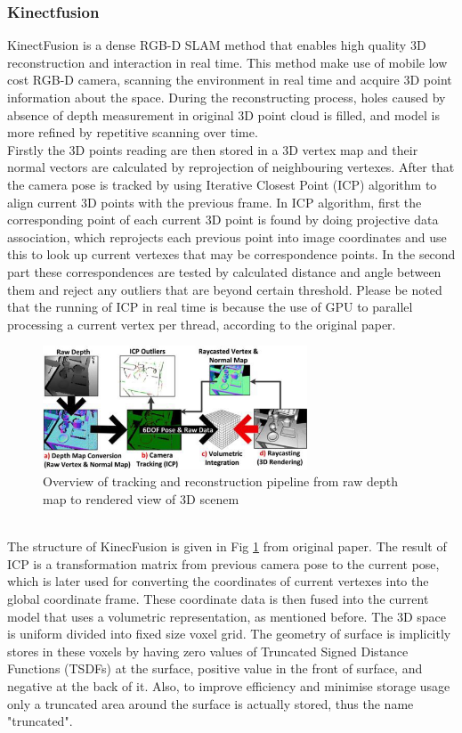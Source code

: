 \documentclass[12pt,twoside]{article}
\begin{document}
\subsubsection{Kinectfusion}
KinectFusion\cite{newcombe2011kinectfusion} is a dense RGB-D SLAM method that enables high quality 3D reconstruction and interaction in real time.
This method make use of mobile low cost RGB-D camera, scanning the environment in real time and acquire 3D point information about the space. During the reconstructing process, holes caused by absence of depth measurement in original 3D point cloud is filled, and model is more refined by repetitive scanning over time.\\
Firstly the 3D points reading are then stored in a 3D vertex map and their normal vectors are calculated by reprojection of neighbouring vertexes. After that the camera pose is tracked by  using Iterative Closest Point (ICP) algorithm to align current 3D points with the previous frame. In ICP algorithm, first the corresponding point of each current 3D point is found by doing  projective data association, which reprojects each previous point into image coordinates and use this to look up current vertexes that may be correspondence points. In the second part these correspondences are tested by calculated distance and angle between them and reject any outliers that are beyond certain threshold. Please be noted that the running of ICP in real time is because the use of GPU to parallel processing a current vertex per thread, according to the original paper.\\
\begin{figure}[h]
    \centering
    \includegraphics[width=0.7\textwidth]{figures/kinec}
    \caption{Overview of tracking and reconstruction pipeline
from raw depth map to rendered view of 3D scenem\cite{newcombe2011kinectfusion}}
    \label{fig:kinec}
\end{figure}
\\The structure of KinecFusion is given in Fig \ref{fig:kinec} from original paper. The result of ICP is a transformation matrix from previous camera pose to the current pose, which is later used for converting the coordinates of current vertexes into the global coordinate frame. These coordinate data is then fused into the current model that uses a volumetric representation, as mentioned before. The 3D space is uniform divided into fixed size voxel grid. The geometry of surface is implicitly stores in these voxels by having zero values of Truncated Signed Distance Functions (TSDFs) at the surface, positive value in the front of surface, and negative at the back of it. Also, to improve efficiency and minimise storage usage only a truncated area around the surface is actually stored, thus the name "truncated".\\
\end{document}
